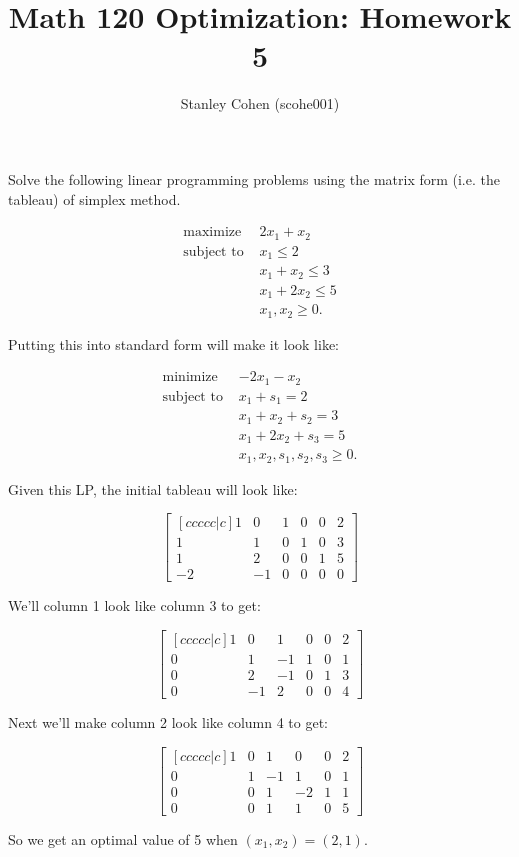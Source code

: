\documentclass[12pt]{extarticle}
\title{Math 120 Optimization: Homework 5}
\author{Stanley Cohen (scohe001)}
\date{}
\theoremstyle{definition}
\begin{document}
\maketitle


Solve the following linear programming problems using the matrix form (i.e. the tableau) of simplex method.

\begin{problem}

	\begin{align*}
	\text{maximize } &2x_1+x_2\\
	\text{subject to } &x_1\leq 2\\
	&x_1+x_2\leq 3\\
	&x_1+2x_2\leq 5\\
	&x_1, x_2\geq 0.
	\end{align*}

	Putting this into standard form will make it look like:

	\begin{align*}
	\text{minimize } &-2x_1-x_2\\
	\text{subject to } &x_1 + s_1 = 2\\
	&x_1+x_2+s_2 = 3\\
	&x_1+2x_2+s_3 = 5\\
	&x_1, x_2, s_1, s_2, s_3 \geq 0.
	\end{align*}

	Given this LP, the initial tableau will look like:

	$$\begin{bmatrix}[ccccc|c] 1&0&1&0&0&2\\1&1&0&1&0&3\\1&2&0&0&1&5\\-2&-1&0&0&0&0\end{bmatrix}$$

	We'll column 1 look like column 3 to get:

	$$\begin{bmatrix}[ccccc|c] 1&0&1&0&0&2\\0&1&-1&1&0&1\\0&2&-1&0&1&3\\0&-1&2&0&0&4\end{bmatrix}$$

	Next we'll make column 2 look like column 4 to get:

	$$\begin{bmatrix}[ccccc|c] 1&0&1&0&0&2\\0&1&-1&1&0&1\\0&0&1&-2&1&1\\0&0&1&1&0&5\end{bmatrix}$$

	So we get an optimal value of 5 when $(x_1,x_2)=(2,1)$.


\end{problem}
\end{document}
